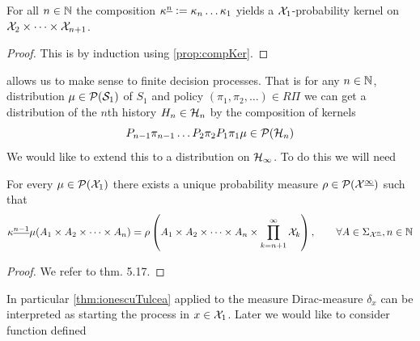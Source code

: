 \begin{prop} For all $n \in \mathbb{N}$ the composition
  $\kappa^{\underline{n}} \vcentcolon= \kappa_n \dots \kappa_1$ yields a $\mathcal{X}_1$-probability
  kernel on $\mathcal{X}_2 \times \dots \times \mathcal{X}_{n+1}$.
  \label{prop:kappaN}
\end{prop}
\begin{proof}
  This is by induction using \cref{prop:compKer}.
\end{proof}

 allows us to make sense to finite decision processes.
That is for any
$n \in \mathbb{N}$, distribution $\mu \in \mathcal{P}(\mathcal{S}_1)$ of $S_1$ 
and policy $(\pi_1, \pi_2, \dots) \in R\Pi$ we can get a distribution
of the $n$th history $H_n \in \mathcal{H}_n$ by the composition of kernels
\[ P_{n-1} \pi_{n-1} 
\dots P_2 \pi_2 P_1 \pi_1 \mu \in \mathcal{P}(\mathcal{H}_n) \]
We would like to extend this to a distribution on $\mathcal{H}_\infty$.
To do this we will need

\begin{thm}
  For every $\mu \in \mathcal{P}(\mathcal{X}_1)$ 
  there exists a unique probability measure
  $\rho \in \mathcal{P}(\mathcal{X}^{\underline{\infty}})$ such that
  \[ \kappa^{\underline{n-1}} \mu (A_1 \times A_2 \times \dots \times A_n) = \rho
    \left( A_1 \times A_2 \times \dots \times A_n \times
    \prod_{k=n+1}^\infty \mathcal{X}_k \right)
  , \qquad \forall A \in \Sigma_{\mathcal{X}^{\underline{n}}}, n \in \mathbb{N} \]
  \label{thm:ionescuTulcea}
\end{thm}
\begin{proof}
  We refer to  thm. 5.17. %
\end{proof}

In particular \cref{thm:ionescuTulcea} applied to the measure Dirac-measure
$\delta_x$ can be interpreted as starting the process in $x \in \mathcal{X}_1$.
Later we would like to consider function defined


